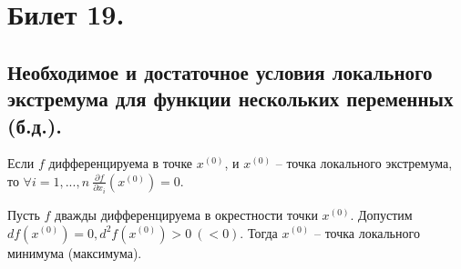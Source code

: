 \section{Билет 19.}

\subsection{Необходимое и достаточное условия локального экстремума для функции нескольких переменных (б.д.).}
\begin{theorem}
    Если $f$ дифференцируема в точке $x^{(0)}$, и $x^{(0)}$ -- точка локального экстремума, то $\forall i = 1, ..., n \> \frac{\partial f}{\partial x_i}(x^{(0)}) = 0$.
\end{theorem}
\begin{theorem}
    Пусть $f$ дважды дифференцируема в окрестности точки $x^{(0)}$. Допустим $d f(x^{(0)}) = 0, d^2 f(x^{(0)}) > 0 \> (< 0).$ Тогда $x^{(0)}$ -- точка локального минимума (максимума).
\end{theorem}